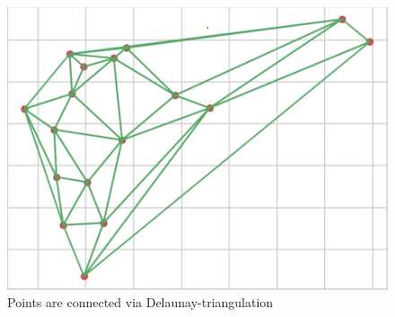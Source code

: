 \begin{figure}[h]
	\begin{centering}
		\centerline
		{\includegraphics[scale = 0.5]{figures/related_work/triangulation.png}}
		\caption{Points are connected via Delaunay-triangulation}
		\label{fig:triangulation}
	\end{centering}
\end{figure}
\FloatBarrier